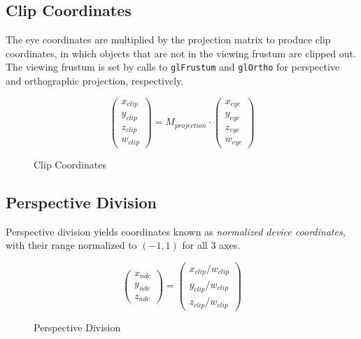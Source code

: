 \documentclass[letterpaper,10pt]{article}
\begin{document}
\subsection{Clip Coordinates}
The eye coordinates are multiplied by the projection matrix to produce clip coordinates, in which objects that are not in the viewing frustum are clipped out. The viewing frustum is set by calls to \verb!glFrustum! and \verb!glOrtho! for perspective and orthographic projection, respectively. \\
\begin{figure}[h]
\[
\begin{pmatrix}
x_{clip} \\
y_{clip} \\
z_{clip} \\
w_{clip}
\end{pmatrix}
= M_{projection} \cdot
\begin{pmatrix}
x_{eye} \\
y_{eye} \\
z_{eye} \\
w_{eye}
\end{pmatrix}
\]
\caption{Clip Coordinates}
\end{figure}

\subsection{Perspective Division}
Perspective division yields coordinates known as \emph{normalized device coordinates}, with their range normalized to $(-1,1)$ for all 3 axes.\\
\begin{figure}[h]
\[
\begin{pmatrix}
x_{ndc} \\
y_{ndc} \\
z_{ndc}
\end{pmatrix}
=
\begin{pmatrix}
x_{clip}/w_{clip} \\
y_{clip}/w_{clip} \\
z_{clip}/w_{clip}
\end{pmatrix}
\]
\caption{Perspective Division}
\end{figure}
\end{document}
